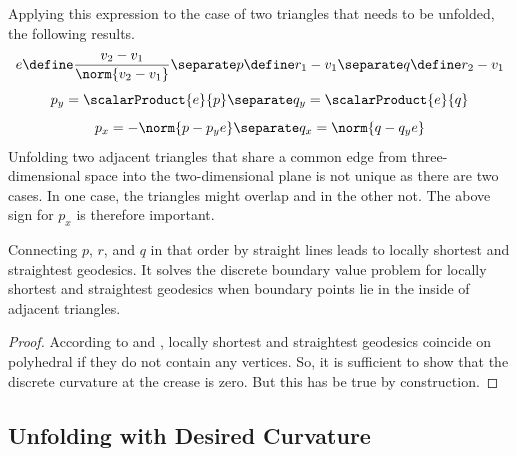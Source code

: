 \documentclass{stdlocal}
\begin{document}
Applying this expression to the case of two triangles that needs to be unfolded, the following results.
\[
  e \define \frac{v_2 - v_1}{\norm{v_2 - v_1}}
  \separate
  p \define r_1 - v_1
  \separate
  q \define r_2 - v_1
\]
\[
  p_y = \scalarProduct{e}{p}
  \separate
  q_y = \scalarProduct{e}{q}
\]
\[
  p_x = -\norm{p - p_y e}
  \separate
  q_x = \norm{q - q_y e}
\]
Unfolding two adjacent triangles that share a common edge from three-dimensional space into the two-dimensional plane is not unique as there are two cases.
In one case, the triangles might overlap and in the other not.
The above sign for $p_x$ is therefore important.

\begin{lemma}
  Connecting $p$, $r$, and $q$ in that order by straight lines leads to locally shortest and straightest geodesics.
  It solves the discrete boundary value problem for locally shortest and straightest geodesics when boundary points lie in the inside of adjacent triangles.
\end{lemma}
\begin{proof}
  According to \textcite{polthier2006} and \textcite{martinez2005}, locally shortest and straightest geodesics coincide on polyhedral if they do not contain any vertices.
  So, it is sufficient to show that the discrete curvature at the crease is zero.
  But this has be true by construction.
\end{proof}

\subsection{Unfolding with Desired Curvature} %
\label{sub:unfolding_with_desired_curvature}
\end{document}
